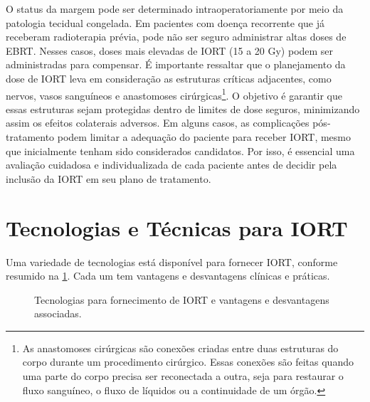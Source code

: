 \documentclass[11pt,a4paper]{article}
\begin{document}
	O status da margem pode ser determinado intraoperatoriamente por meio da patologia tecidual congelada. Em pacientes com doença recorrente que já receberam radioterapia prévia, pode não ser seguro administrar altas doses de EBRT. Nesses casos, doses mais elevadas de IORT (15 a 20 Gy) podem ser administradas para compensar. É importante ressaltar que o planejamento da dose de IORT leva em consideração as estruturas críticas adjacentes, como nervos, vasos sanguíneos e anastomoses cirúrgicas\footnote{As anastomoses cirúrgicas são conexões criadas entre duas estruturas do corpo durante um procedimento cirúrgico. Essas conexões são feitas quando uma parte do corpo precisa ser reconectada a outra, seja para restaurar o fluxo sanguíneo, o fluxo de líquidos ou a continuidade de um órgão.}. O objetivo é garantir que essas estruturas sejam protegidas dentro de limites de dose seguros, minimizando assim os efeitos colaterais adversos. Em alguns casos, as complicações pós-tratamento podem limitar a adequação do paciente para receber IORT, mesmo que inicialmente tenham sido considerados candidatos. Por isso, é essencial uma avaliação cuidadosa e individualizada de cada paciente antes de decidir pela inclusão da IORT em seu plano de tratamento.

\section{Tecnologias e Técnicas para IORT}

	Uma variedade de tecnologias está disponível para fornecer IORT, conforme resumido na \ref{fig:iortTecnologias}. Cada um tem vantagens e desvantagens clínicas e práticas.

	\begin{figure}[h]
		\centering
		\caption{Tecnologias para fornecimento de IORT e vantagens e desvantagens associadas.}
		\label{fig:iortTecnologias}
	\end{figure}
\end{document}
